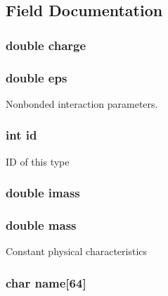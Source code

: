 \subsection{Field Documentation}
\hypertarget{structpart__type_ab3eb30b2f3f9c5ff812ea037220be570}{
\subsubsection[{charge}]{\setlength{\rightskip}{0pt plus 5cm}double charge}}\label{structpart__type_ab3eb30b2f3f9c5ff812ea037220be570}
\hypertarget{structpart__type_a974b448c3d0a13d483d36ef15de369b5}{
\subsubsection[{eps}]{\setlength{\rightskip}{0pt plus 5cm}double eps}}\label{structpart__type_a974b448c3d0a13d483d36ef15de369b5}
Nonbonded interaction parameters. \hypertarget{structpart__type_a7441ef0865bcb3db9b8064dd7375c1ea}{
\subsubsection[{id}]{\setlength{\rightskip}{0pt plus 5cm}int id}}\label{structpart__type_a7441ef0865bcb3db9b8064dd7375c1ea}
I\-D of this type \hypertarget{structpart__type_a6c852117018467a4f780f5e234f2c83c}{
\subsubsection[{imass}]{\setlength{\rightskip}{0pt plus 5cm}double imass}}\label{structpart__type_a6c852117018467a4f780f5e234f2c83c}
\hypertarget{structpart__type_a244bf42c46054cf1113be44d55f2156d}{
\subsubsection[{mass}]{\setlength{\rightskip}{0pt plus 5cm}double mass}}\label{structpart__type_a244bf42c46054cf1113be44d55f2156d}
Constant physical characteristics \hypertarget{structpart__type_ad53db8acabbf75e31bf23d9f20a2c847}{
\subsubsection[{name}]{\setlength{\rightskip}{0pt plus 5cm}char name\mbox{[}64\mbox{]}}}\label{structpart__type_ad53db8acabbf75e31bf23d9f20a2c847}
